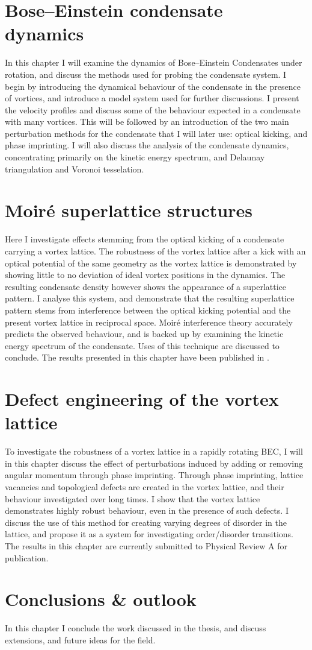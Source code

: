 \section{Bose--Einstein condensate dynamics}
In this chapter I will examine the dynamics of Bose--Einstein Condensates under rotation, and discuss the methods used for probing the condensate system. I begin by introducing the dynamical behaviour of the condensate in the presence of vortices, and introduce a model system used for further discussions. I present the velocity profiles and discuss some of the behaviour expected in a condensate with many vortices. This will be followed by an introduction of the two main perturbation methods for the condensate that I will later use: optical kicking, and phase imprinting. I will also discuss the analysis of the condensate dynamics, concentrating primarily on the kinetic energy spectrum, and Delaunay triangulation and Voronoi tesselation.

\section{Moir\'e superlattice structures}
Here I investigate effects stemming from the optical kicking of a condensate carrying a vortex lattice. The robustness of the vortex lattice after a kick with an optical potential of the same geometry as the vortex lattice is demonstrated by showing little to no deviation of ideal vortex positions in the dynamics. The resulting condensate density however shows the appearance of a superlattice pattern. I analyse this system, and demonstrate that the resulting superlattice pattern stems from interference between the optical kicking potential and the present vortex lattice in reciprocal space. Moir\'e interference theory accurately predicts the observed behaviour, and is backed up by examining the kinetic energy spectrum of the condensate. Uses of this technique are discussed to conclude. The results presented in this chapter have been published in \cite{VTX:oriordan_pra_2016}.

\section{Defect engineering of the vortex lattice}
To investigate the robustness of a vortex lattice in a rapidly rotating BEC, I will in this chapter discuss the effect of perturbations induced by adding or removing angular momentum through phase imprinting. Through phase imprinting, lattice vacancies and topological defects are created in the vortex lattice, and their behaviour investigated over long times. I show that the vortex lattice demonstrates highly robust behaviour, even in the presence of such defects. I discuss the use of this method for creating varying degrees of disorder in the lattice, and propose it as a system for investigating order/disorder transitions. The results in this chapter are currently submitted to Physical Review A for publication.

\section{Conclusions \& outlook}
In this chapter I conclude the work discussed in the thesis, and discuss extensions, and future ideas for the field.
